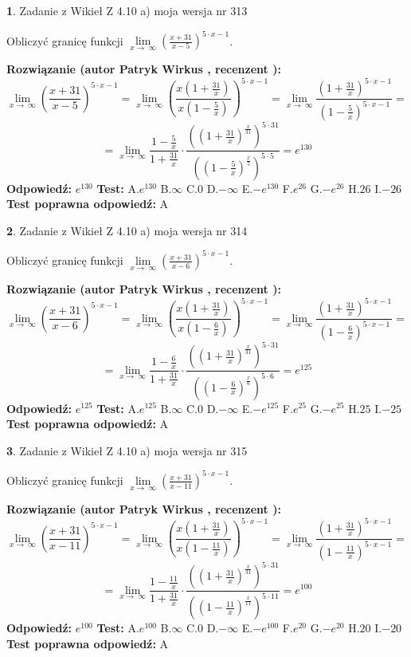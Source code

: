 \documentclass[12pt, a4paper]{article}
\theoremstyle{definition} %
\newtheorem{zad}{}
\newcommand{\zadStart}[1]{\begin{zad}#1\newline}
\newcommand{\zadStop}{\end{zad}}
\newcommand{\rozwStart}[2]{\noindent \textbf{Rozwiązanie (autor #1 , recenzent #2): }\newline}
\newcommand{\rozwStop}{\newline}
\newcommand{\odpStart}{\noindent \textbf{Odpowiedź:}\newline}
\newcommand{\odpStop}{\newline}
\newcommand{\testStart}{\noindent \textbf{Test:}\newline}
\newcommand{\testStop}{\newline}
\newcommand{\kluczStart}{\noindent \textbf{Test poprawna odpowiedź:}\newline}
\newcommand{\kluczStop}{\newline}
\begin{document}
\zadStart{Zadanie z Wikieł Z 4.10 a) moja wersja nr 313}

Obliczyć granicę funkcji  $\lim\limits_{x\to\ \infty}(\frac{x+31}{x-5})^{5\cdot x-1}$.
\zadStop
\rozwStart{Patryk Wirkus}{}
$$\lim\limits_{x\to\ \infty}(\frac{x+31}{x-5})^{5\cdot x-1} = \lim\limits_{x\to\ \infty}(\frac{x(1+\frac{31}{x})}{x(1-\frac{5}{x})})^{5\cdot x-1}=\lim\limits_{x\to\ \infty}\frac{(1+\frac{31}{x})^{5\cdot x-1}}{(1-\frac{5}{x})^{5\cdot x-1}}=$$
$$=\lim\limits_{x\to\ \infty}\frac{1-\frac{5}{x}}{1+\frac{31}{x}}\cdot\frac{((1+\frac{31}{x})^{\frac{x}{31}})^{5\cdot31}}{((1-\frac{5}{x})^{\frac{x}{5}})^{5\cdot5}}=e^{130}$$
\rozwStop
\odpStart
$e^{130}$
\odpStop
\testStart
A.$e^{130}$ B.$\infty$ C.$0$ D.$-\infty$ E.$-e^{130}$
F.$e^{26}$ G.$-e^{26}$
H.$26$
I.$-26$
\testStop
\kluczStart
A
\kluczStop



\zadStart{Zadanie z Wikieł Z 4.10 a) moja wersja nr 314}

Obliczyć granicę funkcji  $\lim\limits_{x\to\ \infty}(\frac{x+31}{x-6})^{5\cdot x-1}$.
\zadStop
\rozwStart{Patryk Wirkus}{}
$$\lim\limits_{x\to\ \infty}(\frac{x+31}{x-6})^{5\cdot x-1} = \lim\limits_{x\to\ \infty}(\frac{x(1+\frac{31}{x})}{x(1-\frac{6}{x})})^{5\cdot x-1}=\lim\limits_{x\to\ \infty}\frac{(1+\frac{31}{x})^{5\cdot x-1}}{(1-\frac{6}{x})^{5\cdot x-1}}=$$
$$=\lim\limits_{x\to\ \infty}\frac{1-\frac{6}{x}}{1+\frac{31}{x}}\cdot\frac{((1+\frac{31}{x})^{\frac{x}{31}})^{5\cdot31}}{((1-\frac{6}{x})^{\frac{x}{6}})^{5\cdot6}}=e^{125}$$
\rozwStop
\odpStart
$e^{125}$
\odpStop
\testStart
A.$e^{125}$ B.$\infty$ C.$0$ D.$-\infty$ E.$-e^{125}$
F.$e^{25}$ G.$-e^{25}$
H.$25$
I.$-25$
\testStop
\kluczStart
A
\kluczStop



\zadStart{Zadanie z Wikieł Z 4.10 a) moja wersja nr 315}

Obliczyć granicę funkcji  $\lim\limits_{x\to\ \infty}(\frac{x+31}{x-11})^{5\cdot x-1}$.
\zadStop
\rozwStart{Patryk Wirkus}{}
$$\lim\limits_{x\to\ \infty}(\frac{x+31}{x-11})^{5\cdot x-1} = \lim\limits_{x\to\ \infty}(\frac{x(1+\frac{31}{x})}{x(1-\frac{11}{x})})^{5\cdot x-1}=\lim\limits_{x\to\ \infty}\frac{(1+\frac{31}{x})^{5\cdot x-1}}{(1-\frac{11}{x})^{5\cdot x-1}}=$$
$$=\lim\limits_{x\to\ \infty}\frac{1-\frac{11}{x}}{1+\frac{31}{x}}\cdot\frac{((1+\frac{31}{x})^{\frac{x}{31}})^{5\cdot31}}{((1-\frac{11}{x})^{\frac{x}{11}})^{5\cdot11}}=e^{100}$$
\rozwStop
\odpStart
$e^{100}$
\odpStop
\testStart
A.$e^{100}$ B.$\infty$ C.$0$ D.$-\infty$ E.$-e^{100}$
F.$e^{20}$ G.$-e^{20}$
H.$20$
I.$-20$
\testStop
\kluczStart
A
\kluczStop
\end{document}
